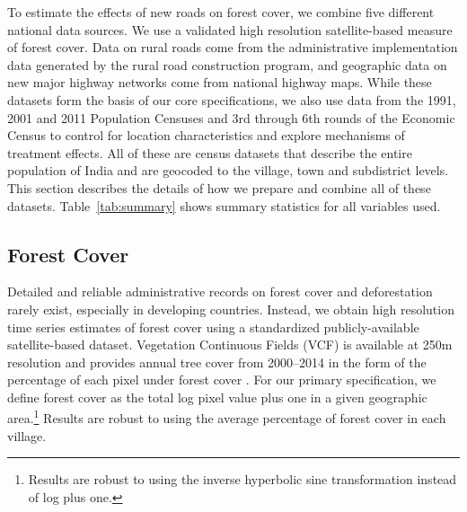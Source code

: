 \label{sec:data}


To estimate the effects of new roads on forest cover, we combine five
different national data sources. We use a validated high resolution
satellite-based measure of forest cover. Data on rural roads come from
the administrative implementation data generated by the rural road
construction program, and geographic data on new major highway
networks come from national highway maps. While these datasets form
the basis of our core specifications, we also use data from the 1991,
2001 and 2011 Population Censuses and 3rd through 6th rounds of the
Economic Census to control for location characteristics and explore
mechanisms of treatment effects. All of these are census datasets that
describe the entire population of India and are geocoded to the
village, town and subdistrict levels. This section describes the
details of how we prepare and combine all of these datasets.
Table~\ref{tab:summary} shows summary statistics for all variables used.

\subsection{Forest Cover}

Detailed and reliable administrative records on forest cover and
deforestation rarely exist, especially in developing
countries. Instead, we obtain high resolution time series estimates of
forest cover using a standardized publicly-available satellite-based
dataset. Vegetation Continuous Fields (VCF) is available at 250m
resolution and provides annual tree cover from 2000--2014 in the form
of the percentage of each pixel under forest cover \cite{THCDS11}. For
our primary specification, we define forest cover as the total log
pixel value plus one in a given geographic area.\footnote{Results are
  robust to using the inverse hyperbolic sine transformation instead
  of log plus one.} Results are robust to using the average percentage
of forest cover in each village.

